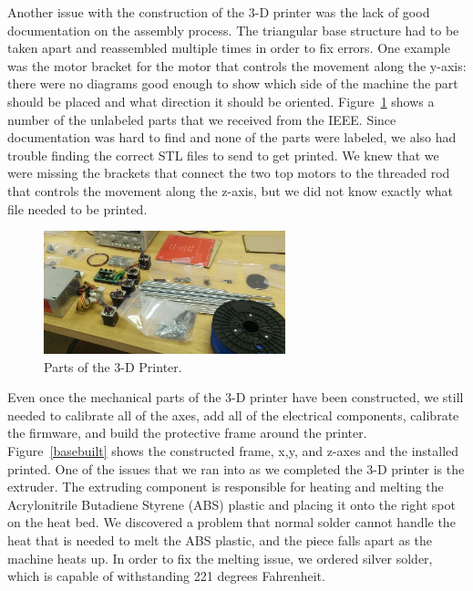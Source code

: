 \documentclass[pdftex,10.5pt]{report}
\begin{document}
Another issue with the construction of the 3-D printer was the lack of good documentation on the assembly process. The triangular base structure had to be taken apart and reassembled multiple times in order to fix errors. One example was the motor bracket for the motor that controls the movement along the y-axis: there were no diagrams good enough to show which side of the machine the part should be placed and what direction it should be oriented. Figure~\ref{parts} shows a number of the unlabeled parts that we received from the IEEE. Since documentation was hard to find and none of the parts were labeled, we also had trouble finding the correct STL files to send to get printed. We knew that we were missing the brackets that connect the two top motors to the threaded rod that controls the movement along the z-axis, but we did not know exactly what file needed to be printed.

\begin{figure}[H]
	\centering
	\includegraphics[width=70mm]{figures/WP_20130223_002.jpg}
	\caption{Parts of the 3-D  Printer.}
	\label{parts}
\end{figure}

Even once the mechanical parts of the 3-D printer have been constructed, we still needed to calibrate all of the axes, add all of the electrical components, calibrate the firmware, and build the protective frame around the printer. Figure~\ref{basebuilt} shows the constructed frame, x,y, and z-axes and the installed printed. One of the issues that we ran into as we completed the 3-D printer is the extruder. The extruding component is responsible for heating and melting the Acrylonitrile Butadiene Styrene (ABS) plastic and placing it onto the right spot on the heat bed. We discovered a problem that normal solder cannot handle the heat that is needed to melt the ABS plastic, and the piece falls apart as the machine heats up. In order to fix the melting issue, we ordered silver solder, which is capable of withstanding 221 degrees Fahrenheit. 
\end{document}
